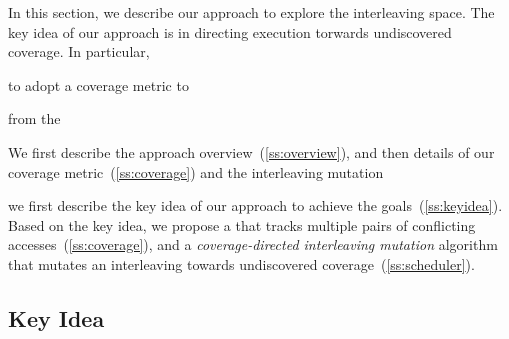 In this section, we describe our approach to explore the interleaving
space.
%
The key idea of our approach is in directing execution torwards
undiscovered coverage.
%
In particular, 

to adopt a coverage metric to 

from the


%
We first describe the approach overview~(\autoref{ss:overview}), and
then details of our coverage metric~(\autoref{ss:coverage}) and the
interleaving mutation


we first describe the key idea of our approach to
achieve the goals~(\autoref{ss:keyidea}). Based on the key idea, we
propose a \textit{\coverage} that tracks multiple pairs of conflicting
accesses~(\autoref{ss:coverage}), and a \textit{coverage-directed
  interleaving mutation} algorithm that mutates an interleaving
towards undiscovered coverage~(\autoref{ss:scheduler}).



\subsection{Key Idea}
\label{ss:keyidea}



